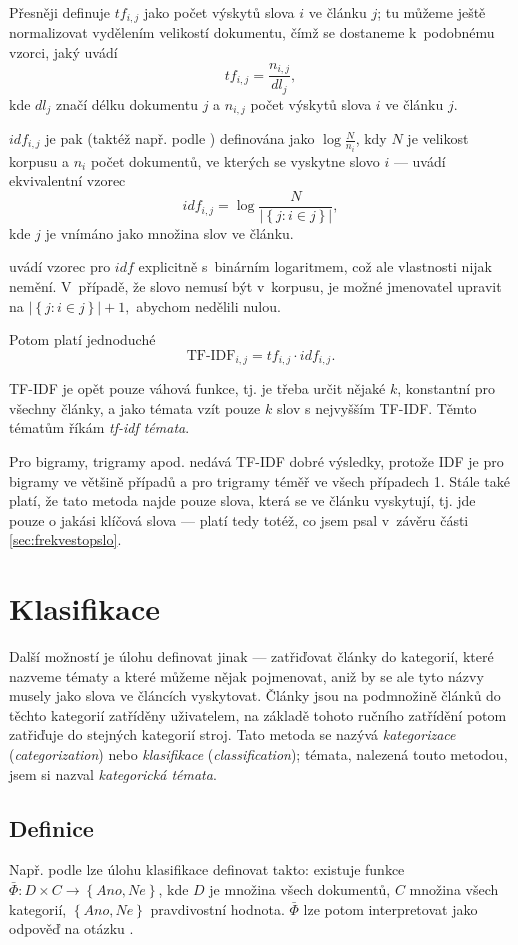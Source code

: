\documentclass[12pt,a4paper]{report}
\begin{document}
Přesněji definuje \cite{understanding} $tf_{i,j}$  jako počet výskytů slova $i$ ve článku $j$; tu můžeme ještě normalizovat vydělením velikostí do\-ku\-men\-tu, čímž se do\-sta\-ne\-me k~podobnému vzorci, jaký uvádí \cite{wikitfidf} $$tf_{i,j}=\frac{n_{i,j}}{dl_j},$$ kde $dl_j$ značí délku dokumentu $j$ a $n_{i,j}$ počet výskytů slova $i$ ve článku $j$.

$idf_{i,j}$ je pak (taktéž např. podle \cite{understanding}) definována jako $\log\frac{N}{n_i}$, kdy $N$ je velikost korpusu a $n_i$ počet dokumentů, ve kterých se vyskytne slovo $i$ --- \cite{wikitfidf} uvádí ekvivalentní vzorec $$idf_{i,j}=\log\frac{N}{\left|\left\{j: i \in j\right\}\right|},$$ kde $j$ je vnímáno jako množina slov ve článku.

\cite{introduction} uvádí vzorec pro $idf$ explicitně s~binárním logaritmem, což ale vlastnosti nijak nemění. V~případě, že slovo nemusí být v~korpusu, je možné jmenovatel upravit na $\left|\left\{j: i \in j\right\}\right|+1,$ abychom nedělili nulou.

Potom platí jednoduché $$\mbox{TF-IDF}_{i,j}=tf_{i,j}\cdot idf_{i,j}.$$

TF-IDF je opět pouze váhová funkce, tj. je třeba určit nějaké $k$, konstantní pro všechny články, a jako témata vzít pouze  $k$ slov s nejvyšším TF-IDF. Těmto tématům říkám \emph{tf-idf témata}.

Pro bigramy, trigramy apod. nedává TF-IDF dobré výsledky, protože IDF je pro bigramy ve většině případů a pro trigramy téměř ve všech případech 1. Stále také platí, že tato metoda najde pouze slova, která se ve článku vyskytují, tj. jde pouze o jakási klíčová slova --- platí tedy totéž, co jsem psal v~závěru části \ref{sec:frekvestopslo}.

\section{Klasifikace}
\label{sec:kategorizace}
Další možností je úlohu definovat jinak --- zatřiďovat články do kategorií, které nazveme tématy a které můžeme nějak pojmenovat, aniž by se ale tyto názvy musely jako slova ve článcích vyskytovat. Články jsou na podmnožině článků do těchto kategorií zatříděny uživatelem, na základě tohoto ručního zatřídění potom zatřiďuje do stejných kategorií stroj. Tato metoda se nazývá \emph{kategorizace} (\emph{categorization}) nebo \emph{klasifikace} (\emph{classification}); témata, nalezená touto metodou, jsem si nazval \emph{kategorická témata}.

\subsection{Definice}
 \label{sec:kategorizace_def}
Např. podle \cite{machine_intro} lze úlohu klasifikace definovat takto: existuje funkce $\bar{\Phi}: D \times C \rightarrow \left\{Ano, Ne\right\}$, kde $D$ je množina všech dokumentů, $C$ množina všech kategorií, $\left\{Ano, Ne\right\}$ pravdivostní hodnota. $\bar{\Phi}$ lze potom interpretovat jako odpověď na otázku .
\end{document}
